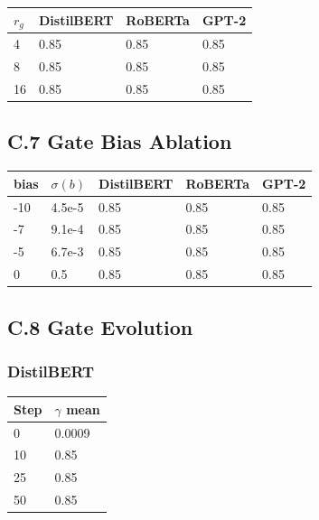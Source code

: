 \begin{table}[H]
\centering
\small
\begin{tabular}{llll}
\toprule
\textbf{$r_g$} & \textbf{DistilBERT} & \textbf{RoBERTa} & \textbf{GPT-2} \\
\midrule
4 & 0.85 & 0.85 & 0.85 \\
8 & 0.85 & 0.85 & 0.85 \\
16 & 0.85 & 0.85 & 0.85 \\
\bottomrule
\end{tabular}
\end{table}

\subsection{C.7 Gate Bias Ablation}

\begin{table}[H]
\centering
\small
\begin{tabular}{lllll}
\toprule
\textbf{bias} & \textbf{$\sigma(b)$} & \textbf{DistilBERT} & \textbf{RoBERTa} & \textbf{GPT-2} \\
\midrule
-10 & 4.5e-5 & 0.85 & 0.85 & 0.85 \\
-7 & 9.1e-4 & 0.85 & 0.85 & 0.85 \\
-5 & 6.7e-3 & 0.85 & 0.85 & 0.85 \\
0 & 0.5 & 0.85 & 0.85 & 0.85 \\
\bottomrule
\end{tabular}
\end{table}

\subsection{C.8 Gate Evolution}

\subsubsection{DistilBERT}

\begin{table}[H]
\centering
\small
\begin{tabular}{ll}
\toprule
\textbf{Step} & \textbf{$\gamma$ mean} \\
\midrule
0 & 0.0009 \\
10 & 0.85 \\
25 & 0.85 \\
50 & 0.85 \\
\bottomrule
\end{tabular}
\end{table}

